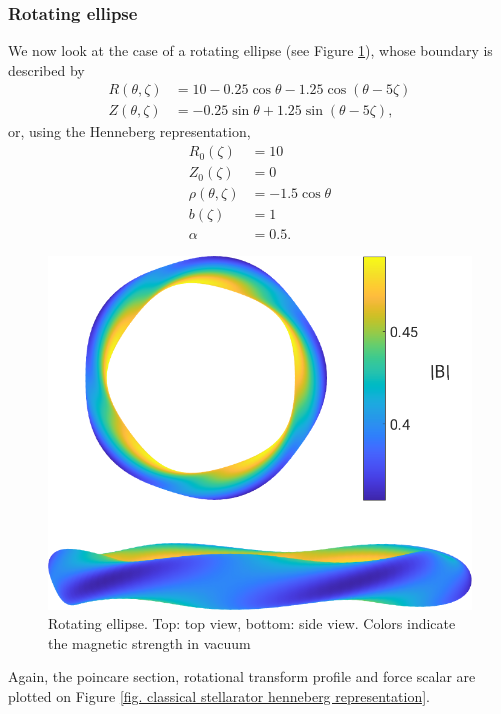 \documentclass[my_thesis.tex]{subfiles}
\begin{document}
\subsubsection{Rotating ellipse}
We now look at the case of a rotating ellipse (see Figure \ref{fig. rotating ellipse geometry}), whose boundary is described by
\begin{align}
	R(\theta,\zeta) &= 10 - 0.25\cos\theta - 1.25\cos(\theta-5\zeta)\\
	Z(\theta,\zeta) &= -0.25\sin\theta + 1.25\sin(\theta-5\zeta),
\end{align}
or, using the Henneberg representation, 
\begin{align}
	R_0(\zeta) &= 10\\
	Z_0(\zeta) &= 0\\
	\rho(\theta,\zeta) &= -1.5\cos\theta\\
	b(\zeta) &= 1\\
	\alpha &= 0.5.
\end{align}
\begin{figure}
	\centering
	\includegraphics[width=.8\linewidth]{images/HennebergRepresentation/RotatingEllipse_modB_boundary.png}
	\caption{Rotating ellipse. Top: top view, bottom: side view. Colors indicate the magnetic strength in vacuum}
	\label{fig. rotating ellipse geometry}
\end{figure}
Again, the poincare section, rotational transform profile and force scalar are plotted on Figure \ref{fig. classical stellarator henneberg representation}. 
\end{document}
